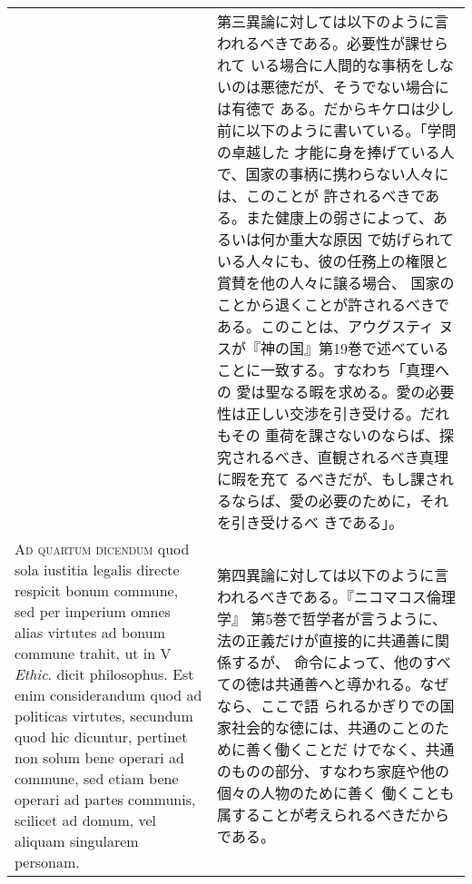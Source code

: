 \documentclass[10pt]{jsarticle}
\begin{document}
\begin{longtable}{p{21em}p{21em}}
&

 第三異論に対しては以下のように言われるべきである。必要性が課せられて
 いる場合に人間的な事柄をしないのは悪徳だが、そうでない場合には有徳で
 ある。だからキケロは少し前に以下のように書いている。「学問の卓越した
 才能に身を捧げている人で、国家の事柄に携わらない人々には、このことが
 許されるべきである。また健康上の弱さによって、あるいは何か重大な原因
 で妨げられている人々にも、彼の任務上の権限と賞賛を他の人々に譲る場合、
 国家のことから退くことが許されるべきである。このことは、アウグスティ
 ヌスが『神の国』第19巻で述べていることに一致する。すなわち「真理への
 愛は聖なる暇を求める。愛の必要性は正しい交渉を引き受ける。だれもその
 重荷を課さないのならば、探究されるべき、直観されるべき真理に暇を充て
 るべきだが、もし課されるならば、愛の必要のために，それを引き受けるべ
 きである」。
 
\\



{\scshape Ad quartum dicendum} quod sola iustitia legalis directe
respicit bonum commune, sed per imperium omnes alias virtutes ad bonum
commune trahit, ut in V {\itshape Ethic}. dicit philosophus. Est enim
considerandum quod ad politicas virtutes, secundum quod hic dicuntur,
pertinet non solum bene operari ad commune, sed etiam bene operari ad
partes communis, scilicet ad domum, vel aliquam singularem personam.


&

 第四異論に対しては以下のように言われるべきである。『ニコマコス倫理学』
 第5巻で哲学者が言うように、法の正義だけが直接的に共通善に関係するが、
 命令によって、他のすべての徳は共通善へと導かれる。なぜなら、ここで語
 られるかぎりでの国家社会的な徳には、共通のことのために善く働くことだ
 けでなく、共通のものの部分、すなわち家庭や他の個々の人物のために善く
 働くことも属することが考えられるべきだからである。

\end{longtable}
\end{document}
